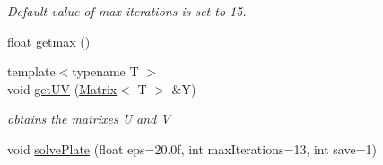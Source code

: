 \begin{DoxyCompactItemize}
\begin{DoxyCompactList}\small\item\em Default value of max iterations is set to 15. \end{DoxyCompactList}\item 
float \hyperlink{classanpi_1_1ThermalPlate_a13e2c721d18c3b0ee1d6cc4377dd563e}{getmax} ()
\item 
{\footnotesize template$<$typename T $>$ }\\void \hyperlink{classanpi_1_1ThermalPlate_a2a172d26e8c9457222299e2fc2415ea2}{get\+UV} (\hyperlink{classanpi_1_1Matrix}{Matrix}$<$ T $>$ \&Y)
\begin{DoxyCompactList}\small\item\em obtains the matrixes U and V \end{DoxyCompactList}\item 
void \hyperlink{classanpi_1_1ThermalPlate_a8f3535a477baff44346118527ff42090}{solve\+Plate} (float eps=20.\+0f, int max\+Iterations=13, int save=1)
\end{DoxyCompactItemize}
